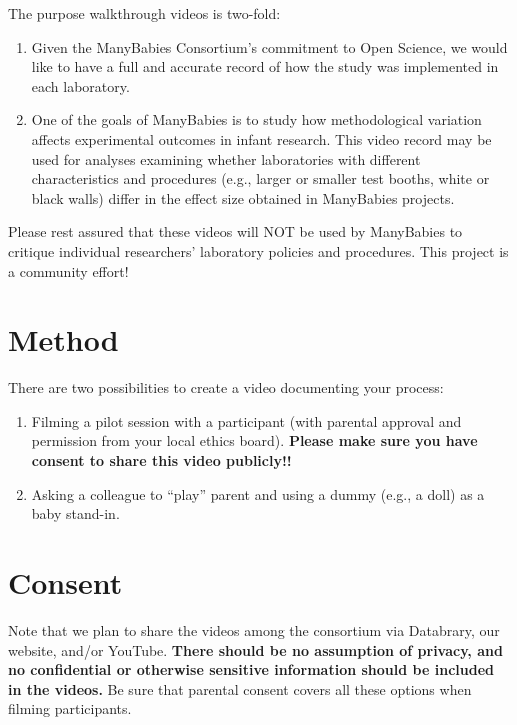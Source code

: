 \documentclass[
  letterpaper,
  DIV=11,
  numbers=noendperiod,
  oneside]{scrreprt}
\providecommand{\tightlist}{%
  \setlength{\itemsep}{0pt}\setlength{\parskip}{0pt}}
\begin{document}
The purpose walkthrough videos is two-fold:

\begin{enumerate}
\def\labelenumi{\arabic{enumi}.}
\tightlist
\item
  Given the ManyBabies Consortium's commitment to Open Science, we would
  like to have a full and accurate record of how the study was
  implemented in each laboratory.
\item
  One of the goals of ManyBabies is to study how methodological
  variation affects experimental outcomes in infant research. This video
  record may be used for analyses examining whether laboratories with
  different characteristics and procedures (e.g., larger or smaller test
  booths, white or black walls) differ in the effect size obtained in
  ManyBabies projects.
\end{enumerate}

Please rest assured that these videos will NOT be used by ManyBabies to
critique individual researchers' laboratory policies and procedures.
This project is a community effort!

\section{Method}\label{method}

There are two possibilities to create a video documenting your process:

\begin{enumerate}
\def\labelenumi{\arabic{enumi}.}
\tightlist
\item
  Filming a pilot session with a participant (with parental approval and
  permission from your local ethics board). \textbf{Please make sure you
  have consent to share this video publicly!!}
\item
  Asking a colleague to ``play'' parent and using a dummy (e.g., a doll)
  as a baby stand-in.
\end{enumerate}

\section{Consent}\label{consent}

Note that we plan to share the videos among the consortium via
Databrary, our website, and/or YouTube. \textbf{There should be no
assumption of privacy, and no confidential or otherwise sensitive
information should be included in the videos.} Be sure that parental
consent covers all these options when filming participants.
\end{document}
